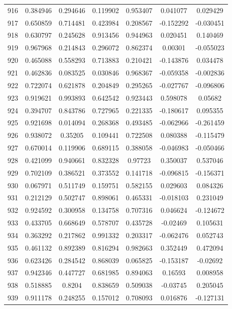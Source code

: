 \begin{table}
\begin{tabular}{c|c|c|c|c|c|c}
916 & 0.384946 & 0.294646 & 0.119902 & 0.953407 & 0.041077 & 0.029429\\
917 & 0.650859 & 0.714481 & 0.423984 & 0.208567 & -0.152292 & -0.030451\\
918 & 0.630797 & 0.245628 & 0.913456 & 0.944963 & 0.020451 & 0.140469\\
919 & 0.967968 & 0.214843 & 0.296072 & 0.862374 & 0.00301 & -0.055023\\
920 & 0.465088 & 0.558293 & 0.713883 & 0.210421 & -0.143876 & 0.034478\\
921 & 0.462836 & 0.083525 & 0.030846 & 0.968367 & -0.059358 & -0.002836\\
922 & 0.722074 & 0.621878 & 0.204849 & 0.295265 & -0.027767 & -0.096806\\
923 & 0.919621 & 0.993893 & 0.642542 & 0.923443 & 0.598078 & 0.05682\\
924 & 0.394707 & 0.843786 & 0.727965 & 0.221335 & -0.180617 & 0.095355\\
925 & 0.921698 & 0.014094 & 0.268368 & 0.493485 & -0.062966 & -0.261459\\
926 & 0.938072 & 0.35205 & 0.109441 & 0.722508 & 0.080388 & -0.115479\\
927 & 0.670014 & 0.119906 & 0.689115 & 0.388058 & -0.046983 & -0.050466\\
928 & 0.421099 & 0.940661 & 0.832328 & 0.97723 & 0.350037 & 0.537046\\
929 & 0.702109 & 0.386521 & 0.373552 & 0.141718 & -0.096815 & -0.156371\\
930 & 0.067971 & 0.511749 & 0.159751 & 0.582155 & 0.029603 & 0.084326\\
931 & 0.212129 & 0.502747 & 0.898061 & 0.465331 & -0.018103 & 0.231049\\
932 & 0.924592 & 0.300958 & 0.134758 & 0.707316 & 0.046624 & -0.124672\\
933 & 0.433705 & 0.668649 & 0.578707 & 0.435728 & -0.02469 & 0.105631\\
934 & 0.363292 & 0.217862 & 0.991332 & 0.203317 & -0.062476 & 0.052743\\
935 & 0.461132 & 0.892389 & 0.816294 & 0.982663 & 0.352449 & 0.472094\\
936 & 0.623426 & 0.284542 & 0.868039 & 0.065825 & -0.153187 & -0.02692\\
937 & 0.942346 & 0.447727 & 0.681985 & 0.894063 & 0.16593 & 0.008958\\
938 & 0.518885 & 0.8204 & 0.838659 & 0.509038 & -0.03745 & 0.205045\\
939 & 0.911178 & 0.248255 & 0.157012 & 0.708093 & 0.016876 & -0.127131\\

\end{tabular}
\end{table}
